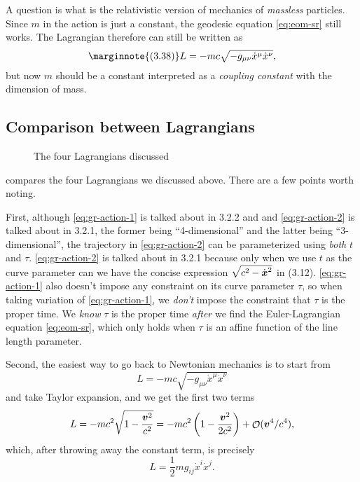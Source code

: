 \documentclass[hyperref, a4paper]{article}
\DeclareMathOperator{\bigO}{\mathcal{O}}
\begin{document}
A question is what is the relativistic version of mechanics of \emph{massless} particles. 
Since $m$ in the action is just a constant, the geodesic equation \eqref{eq:eom-sr} still works. 
The Lagrangian therefore can still be written as 
\begin{equation} \marginnote{(3.38)}
    L = - mc \sqrt{- g_{\mu \nu} \dot{x}^\mu \dot{x}^\nu},
    \label{eq:gr-action-2}
\end{equation}
but now $m$ should be a constant interpreted as a \emph{coupling constant} with the dimension of mass.

\subsection{Comparison between Lagrangians}

\begin{figure}
    \centering
    
    \caption{The four Lagrangians discussed}
    \label{fig:four-lag}
\end{figure}

 compares the four Lagrangians we discussed above. There are a few points worth noting.

First, although \eqref{eq:gr-action-1} is talked about in 3.2.2 and and \eqref{eq:gr-action-2} is talked about in 
3.2.1, the former being ``4-dimensional'' and the latter being ``3-dimensional'', the trajectory in \eqref{eq:gr-action-2} can 
be parameterized using \emph{both} $t$ and $\tau$. \eqref{eq:gr-action-2} is talked about in 3.2.1 because 
only when we use $t$ as the curve parameter can we have the concise expression $\sqrt{c^2 - \dot{\vb*{x}}^2}$ in (3.12).  \eqref{eq:gr-action-1} also doesn't impose any constraint on its curve 
parameter $\tau$, so when taking variation of \eqref{eq:gr-action-1}, we \emph{don't} impose the constraint that 
$\tau$ is the proper time. We \emph{know} $\tau$ is the proper time \emph{after} we find the Euler-Lagrangian
equation \eqref{eq:eom-sr}, which only holds when $\tau$ is an affine function of the line length parameter.

Second, the easiest way to go back to Newtonian mechanics is to start from 
\[
    L = - mc \sqrt{- g_{\mu \nu} \dot{x}^\mu \dot{x}^\nu}
\]
and take Taylor expansion, and we get the first two terms 
\[
    L = - mc^2 \sqrt{1 - \frac{\vb*{v}^2}{c^2}} = - mc^2 \left(1 - \frac{\vb*{v}^2}{2 c^2}\right) + \bigO(\vb*{v}^4 / c^4), 
\]
which, after throwing away the constant term, is precisely 
\[
    L = \frac{1}{2} m g_{ij} \dot{x}^i \dot{x}^j.
\]
\end{document}
